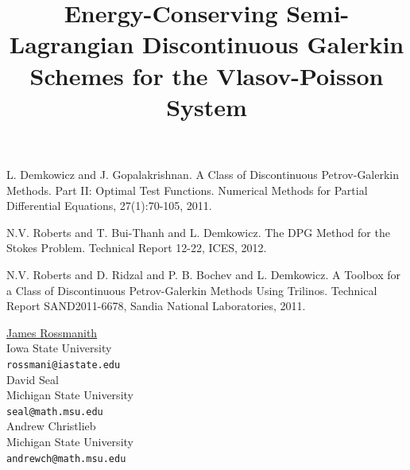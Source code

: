\documentclass[article, A4, 11pt]{llncs}%
\begin{document}

\begin{thebibliography}{10}
{\sc L. Demkowicz and J. Gopalakrishnan}. {A Class of Discontinuous Petrov-Galerkin Methods. Part II: Optimal Test Functions}. Numerical Methods for Partial Differential Equations, 27(1):70-105, 2011.

{\sc N.V. Roberts and T. Bui-Thanh and L. Demkowicz}. {The DPG Method for the Stokes Problem}. Technical Report 12-22, ICES, 2012.

{\sc N.V. Roberts and D. Ridzal and P. B. Bochev and L. Demkowicz}. {A Toolbox for a Class of Discontinuous Petrov-Galerkin Methods Using Trilinos}. Technical Report SAND2011-6678, Sandia National Laboratories, 2011.
\end{thebibliography} %

\title{Energy-Conserving Semi-Lagrangian Discontinuous Galerkin Schemes for the Vlasov-Poisson System}
 \author{} \institute{}
\maketitle
\begin{center}
{\large \underline{James Rossmanith}}\\
Iowa State University\\
{\tt rossmani@iastate.edu}
\\ \vspace{4mm}
{\large David Seal}\\
Michigan State University\\
{\tt seal@math.msu.edu}
\\ \vspace{4mm}
{\large Andrew Christlieb}\\
Michigan State University\\
{\tt andrewch@math.msu.edu}
\end{center}
\end{document}
